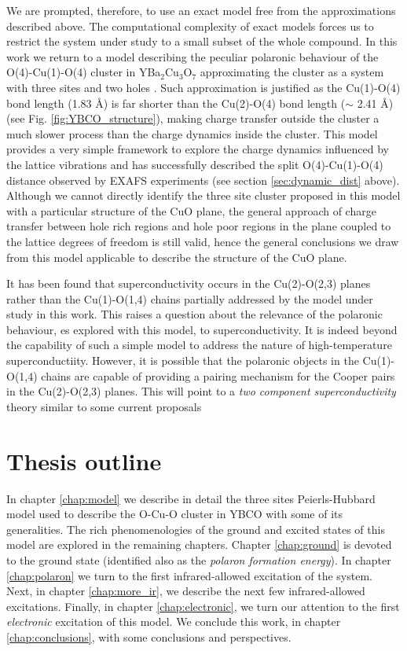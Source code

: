 We are prompted, therefore, to use an exact model free from the approximations described above. 
The computational complexity of exact models forces us to restrict the system under study to a small subset of the whole compound.
In this work we return to a model describing the peculiar polaronic behaviour of the O(4)-Cu(1)-O(4) cluster in YBa$_{2}$Cu$_{3}$O$_{7}$ approximating the cluster as a system with three sites and two holes \cite{MustredeLeon1992}.
Such approximation is justified as the Cu(1)-O(4) bond length (1.83 \AA) is far shorter than the Cu(2)-O(4) bond length ($\sim$ 2.41 \AA) (see Fig. \ref{fig:YBCO_structure}), making charge transfer outside the cluster a much slower process than the charge dynamics inside the cluster. 
This model provides a very simple framework to explore the charge dynamics influenced by the lattice vibrations and has successfully described the split O(4)-Cu(1)-O(4) distance observed by EXAFS experiments (see section \ref{sec:dynamic_dist} above).
Although we cannot directly identify the three site cluster proposed in this model with a particular structure of the CuO plane, the general approach of charge transfer between hole rich regions and hole poor regions in the plane coupled to the lattice degrees of freedom is still valid, hence the general conclusions we draw from this model applicable to describe the structure of the CuO plane.

It has been found that superconductivity occurs in the Cu(2)-O(2,3) planes rather than the Cu(1)-O(1,4) chains partially addressed by the model under study in this work.
This raises a question about the relevance of the polaronic behaviour, es explored with this model, to superconductivity.
It is indeed beyond the capability of such a simple model to address the nature of high-temperature superconductiity.
However, it is possible that the polaronic objects in the Cu(1)-O(1,4) chains are capable of providing a pairing mechanism for the Cooper pairs in the Cu(2)-O(2,3) planes.
This will point to a \textit{two component superconductivity} theory similar to some current proposals \cite{?}

\section{Thesis outline}
\label{sec:outline}


In chapter \ref{chap:model} we describe in detail the three sites Peierls-Hubbard model used to describe the O-Cu-O cluster in YBCO with some of its generalities. 
The rich phenomenologies of the ground and excited states of this model are explored in the remaining chapters. 
Chapter \ref{chap:ground} is devoted to the ground state (identified also as the \textit{polaron formation energy}). 
In chapter \ref{chap:polaron} we turn to the first infrared-allowed excitation of the system. 
Next, in chapter \ref{chap:more_ir}, we describe the next few infrared-allowed excitations. 
Finally, in chapter \ref{chap:electronic}, we turn our attention to the first \textit{electronic} excitation of this model. 
We conclude this work, in chapter \ref{chap:conclusions}, with some conclusions and perspectives.